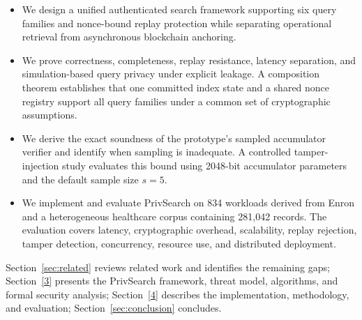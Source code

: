 \documentclass[journal]{IEEEtran}
\theoremstyle{tight}
\theoremstyle{remark}
\theoremstyle{plain}
\begin{document}
\begin{itemize}
\item We design a unified authenticated search framework supporting six query families and nonce-bound replay protection while separating operational retrieval from asynchronous blockchain anchoring.
\item We prove correctness, completeness, replay resistance, latency separation, and simulation-based query privacy under explicit leakage. A composition theorem establishes that one committed index state and a shared nonce registry support all query families under a common set of cryptographic assumptions.
\item We derive the exact soundness of the prototype's sampled accumulator verifier and identify when sampling is inadequate. A controlled tamper-injection study evaluates this bound using 2048-bit accumulator parameters and the default sample size $s=5$.
\item We implement and evaluate PrivSearch on 834 workloads derived from Enron and a heterogeneous healthcare corpus containing 281{,}042 records. The evaluation covers latency, cryptographic overhead, scalability, replay rejection, tamper detection, concurrency, resource use, and distributed deployment.

\end{itemize}
 
Section~\ref{sec:related} reviews related work and identifies the remaining gaps; Section~\ref{3} presents the PrivSearch framework, threat model, algorithms, and formal security analysis; Section~\ref{4} describes the implementation, methodology, and evaluation; Section~\ref{sec:conclusion} concludes.
 
 
 
\end{document}
